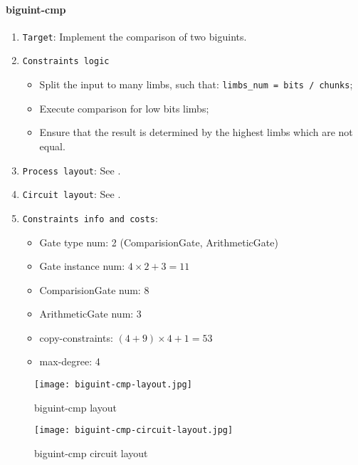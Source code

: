 \paragraph{biguint-cmp}

\begin{enumerate}
    \item \verb|Target|: Implement the comparison of two biguints.
    \item \verb|Constraints logic|
    \begin{itemize}
        \item Split the input to many limbs, such that: \verb|limbs_num = bits / chunks|;
        \item Execute comparison for low bits limbs;
        \item Ensure that the result is determined by the highest limbs which are not equal.
    \end{itemize}
    \item \verb|Process layout|: See .
    \item \verb|Circuit layout|: See .
    \item \verb|Constraints info and costs|:
    \begin{itemize}
        \item Gate type num: 2 (ComparisionGate, ArithmeticGate)
        \item Gate instance num: $4 \times 2 + 3 = 11$
        \item ComparisionGate num: 8
        \item ArithmeticGate num: 3
        \item copy-constraints: $(4 + 9) \times 4 + 1 = 53$
        \item max-degree: 4
    \end{itemize}
\end{enumerate}

\begin{figure}[!ht]
    \centering
    \texttt{[image: biguint-cmp-layout.jpg]}
    \caption{biguint-cmp layout}
    \label{fig:biguint-cmp-layout}
\end{figure}

\begin{figure}[!ht]
    \centering
    \texttt{[image: biguint-cmp-circuit-layout.jpg]}
    \caption{biguint-cmp circuit layout}
    \label{fig:biguint-cmp-circuit-layout}
\end{figure}
